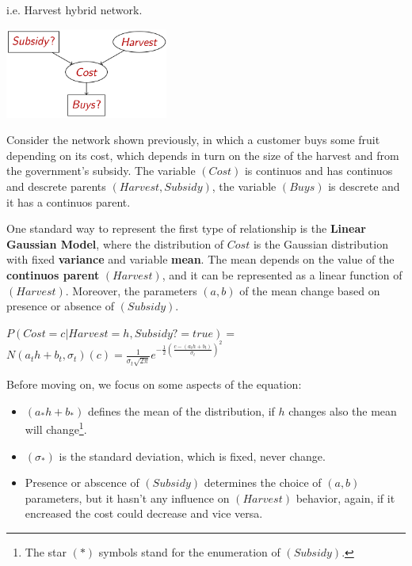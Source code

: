 \begin{example}
    i.e. Harvest hybrid network. \vspace{3.5pt}

    \begin{center}
        \includegraphics[width=0.4\textwidth]{img/img11.png}
    \end{center} \vspace{3.5pt}
    Consider the network shown previously, in which a customer buys some fruit depending on its cost, which depends in turn on the size of the harvest and from the 
    government's subsidy. The variable $(Cost)$ is continuos and has continuos and descrete parents $(Harvest, Subsidy)$, the variable $(Buys)$ is descrete and it has
    a continuos parent. \vspace{3.5pt}

    One standard way to represent the first type of relationship is the \textbf{Linear Gaussian Model}, where the distribution of $Cost$ is the Gaussian distribution 
    with fixed \textbf{variance} and variable \textbf{mean}. The mean depends on the value of the \textbf{continuos parent} $(Harvest)$, and it can be represented
    as a linear function of $(Harvest)$. Moreover, the parameters $(a, b)$ of the mean change based on presence or absence of $(Subsidy)$. \vspace{3.5pt}

    \begin{center}
        $P(Cost = c|Harvest = h, Subsidy ?= true) =$
        $N(a_th+b_t, \sigma_t)(c) = \frac{1}{\sigma_t\sqrt{2\pi}}e^{-\frac{1}{2}(\frac{c - (a_th+b_t)}{\sigma_t})^2}$
    \end{center} \vspace{7pt}
    Before moving on, we focus on some aspects of the equation:
    \begin{itemize}
        \renewcommand{\labelitemi}{-}
        \item $(a_*h+b_*)$ defines the mean of the distribution, if $h$ changes also the mean will change\footnote{The star $(*)$ symbols stand for the enumeration of $(Subsidy)$.}.
        \item $(\sigma_*)$ is the standard deviation, which is fixed, never change.
        \item Presence or abscence of $(Subsidy)$ determines the choice of $(a, b)$ parameters, but it hasn't any influence on $(Harvest)$ behavior, again,
        if it encreased the cost could decrease and vice versa.
    \end{itemize} \vspace{7pt}


\end{example}
